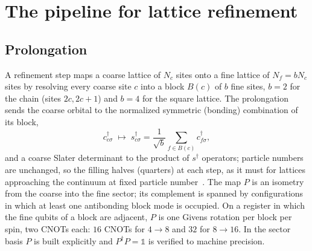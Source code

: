 \documentclass[a4paper,11pt,noarxiv]{quantumarticle}
\begin{document}
\section{The pipeline for lattice refinement}
\label{sec:pipeline}

\subsection{Prolongation}
\label{sec:prolong}
A refinement step maps a coarse lattice of $N_c$ sites onto a fine lattice of
$N_f=bN_c$ sites by resolving every coarse site $c$ into a block $B(c)$ of
$b$ fine sites, $b=2$ for the chain (sites $2c,2c+1$) and $b=4$ for the
square lattice.  The prolongation sends the coarse orbital to the normalized
symmetric (bonding) combination of its block,
\begin{equation}
  c^\dagger_{c\sigma}\;\longmapsto\;
  s^\dagger_{c\sigma}=\frac{1}{\sqrt b}\sum_{f\in B(c)}c^\dagger_{f\sigma},
  \label{eq:bonding}
\end{equation}
and a coarse Slater determinant to the product of $s^\dagger$ operators;
particle numbers are unchanged, so the filling halves (quarters) at each
step, as it must for lattices approaching the continuum at fixed particle
number~\cite{Bogner2026}.  The map $P$ is an isometry from the coarse into
the fine sector; its complement is spanned by configurations in which at
least one antibonding block mode is occupied.  On a register in which the
fine qubits of a block are adjacent, $P$ is one Givens rotation per block
per spin, two CNOTs each: $16$ CNOTs for $4\to8$ and $32$ for $8\to16$.  In
the sector basis $P$ is built explicitly and $P^\dagger P=\mathbb1$ is
verified to machine precision.
\end{document}
